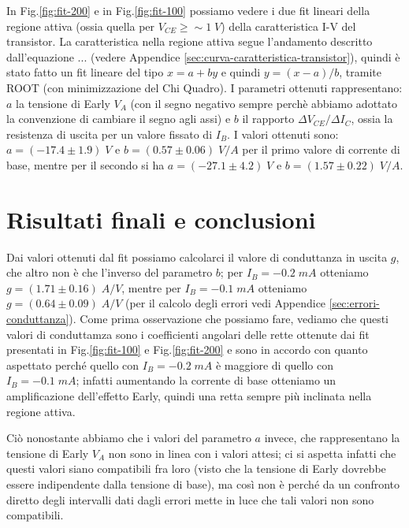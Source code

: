 \documentclass[a4paper, 11pt]{article}
\begin{document}

In Fig.\ref{fig:fit-200} e in Fig.\ref{fig:fit-100} possiamo vedere i due fit lineari della regione attiva (ossia quella per $V_{CE}\geq \sim 1 \;V $) della caratteristica I-V del transistor. La caratteristica nella regione attiva segue l'andamento descritto dall'equazione ... (vedere Appendice \ref{sec:curva-caratteristica-transistor}), quindi è stato fatto un fit lineare del tipo $x = a + by$ e quindi $y = (x-a)/b$, tramite ROOT (con minimizzazione del Chi Quadro). I parametri ottenuti rappresentano: $a$ la tensione di Early $V_A$ (con il segno negativo sempre perchè abbiamo adottato la convenzione di cambiare il segno agli assi) e $b$ il rapporto $\Delta V_{CE} / \Delta I_C$, ossia la resistenza di uscita per un
valore fissato di $I_B$. I valori ottenuti sono: $a = (-17.4 \pm 1.9) \;V$ e $b = (0.57 \pm 0.06) \; V/A$ per il primo valore di corrente di base, mentre per il secondo si ha $a = (-27.1 \pm 4.2) \;V$ e $b = (1.57 \pm 0.22) \; V/A$.
 
\section{Risultati finali e conclusioni}
Dai valori ottenuti dal fit possiamo calcolarci il valore di conduttanza in uscita $g$, che altro non è che l'inverso del parametro $b$; per $I_B = -0.2 \; mA$ otteniamo $g = (1.71 \pm 0.16) \;A/V$, mentre per $I_B = -0.1 \; mA$ otteniamo $g = (0.64 \pm 0.09) \;A/V$ (per il calcolo degli errori vedi Appendice \ref{sec:errori-conduttanza}). Come prima osservazione che possiamo fare, vediamo che questi valori di conduttamza sono i coefficienti angolari delle rette ottenute dai fit presentati in Fig.\ref{fig:fit-100} e Fig.\ref{fig:fit-200} e sono in accordo con quanto aspettato perché quello con $I_B = -0.2 \; mA$ è maggiore di quello con $I_B = -0.1 \; mA$; infatti aumentando la corrente di base otteniamo un amplificazione dell'effetto Early, quindi una retta sempre più inclinata nella regione attiva. 

Ciò nonostante abbiamo che i valori del parametro $a$ invece, che rappresentano la tensione di Early $V_A$ non sono in linea con i valori attesi; ci si aspetta infatti che questi valori siano compatibili fra loro (visto che la tensione di Early dovrebbe essere indipendente dalla tensione di base), ma così non è perché da un confronto diretto degli intervalli dati dagli errori mette in luce che tali valori non sono compatibili.
\end{document}
